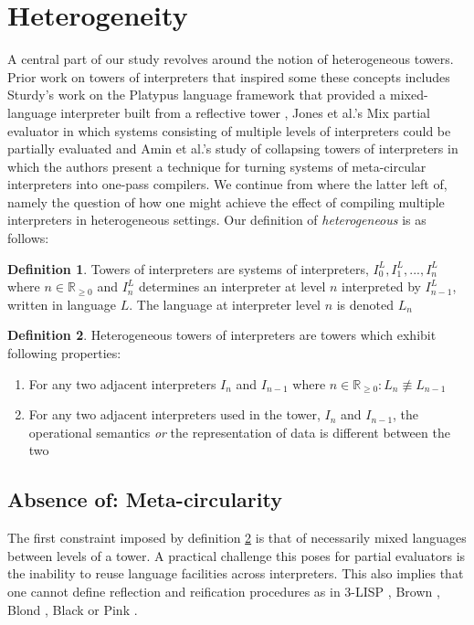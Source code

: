 \documentclass[a4paper,12pt,twoside,openright]{report}
\theoremstyle{definition}
\newtheorem{definition}{Definition}[section]
\begin{document}
\section{Heterogeneity}\label{sec:heterogeneity}
A central part of our study revolves around the notion of heterogeneous towers. Prior work on towers of interpreters that inspired some these concepts includes Sturdy's work on the Platypus language framework that provided a mixed-language interpreter built from a reflective tower \cite{sturdy1993lisp}, Jones et al.'s Mix partial evaluator \cite{jones1989mix} in which systems consisting of multiple levels of interpreters could be partially evaluated and Amin et al.'s study of collapsing towers of interpreters in which the authors present a technique for turning systems of meta-circular interpreters into one-pass compilers. We continue from where the latter left of, namely the question of how one might achieve the effect of compiling multiple interpreters in heterogeneous settings. Our definition of \textit{heterogeneous} is as follows:
\newline
\theoremstyle{definition}
\begin{definition}
	Towers of interpreters are systems of interpreters, $I^L_0, I^L_1, ..., I^L_n$ where $n \in \mathbb R_{\ge 0}$ and $I^L_n$ determines an interpreter at level $n$ interpreted by $I^L_{n-1}$, written in language $L$. The language at interpreter level $n$ is denoted $L_n$
\end{definition}

\begin{definition}
    \label{def:het}
	Heterogeneous towers of interpreters are towers which exhibit following properties:
	\begin{enumerate}
		\item For any two adjacent interpreters $I_n$ and $I_{n-1}$ where $n \in \mathbb R_{\ge 0}: L_n \not\equiv L_{n-1}$
		\item For any two adjacent interpreters used in the tower, $I_{n}$ and $I_{n-1}$, the operational semantics \textit{or} the representation of data is different between the two
	\end{enumerate}
\end{definition}

\subsection{Absence of: Meta-circularity}
The first constraint imposed by definition \ref{def:het} is that of necessarily mixed languages between levels of a tower. A practical challenge this poses for partial evaluators is the inability to reuse language facilities across interpreters. This also implies that one cannot define reflection and reification procedures as in 3-LISP \cite{smith1984reflection}, Brown \cite{wand1988mystery}, Blond \cite{danvy1988intensions}, Black \cite{asai1996duplication} or Pink \cite{amin2017collapsing}.
\end{document}

